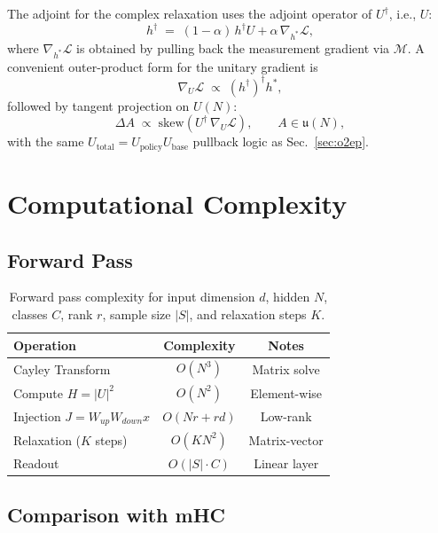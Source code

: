 \documentclass[11pt,a4paper]{article}
\newcommand{\LL}{\mathcal{L}}
\newcommand{\skewop}{\text{skew}}
\begin{document}
The adjoint for the complex relaxation uses the adjoint operator of $U^\dagger$, i.e., $U$:
\begin{equation}
h^\dagger \;=\; (1-\alpha)\,h^\dagger U + \alpha\,\nabla_{h^*}\LL,
\end{equation}
where $\nabla_{h^*}\LL$ is obtained by pulling back the measurement gradient via $\mathcal{M}$. A convenient outer-product form for the unitary gradient is
\begin{equation}
\nabla_U \LL \;\propto\; (h^\dagger)^\dagger h^*,
\end{equation}
followed by tangent projection on $U(N)$:
\begin{equation}
\Delta A \;\propto\; \skewop\!\left(U^\dagger\,\nabla_U\LL\right),\qquad A\in\mathfrak{u}(N),
\end{equation}
with the same $U_{\text{total}}=U_{\text{policy}}U_{\text{base}}$ pullback logic as Sec.~\ref{sec:o2ep}.

\section{Computational Complexity}
\label{sec:complexity}

\subsection{Forward Pass}

\begin{table}[h]
\centering
\begin{tabular}{lcc}
\toprule
\textbf{Operation} & \textbf{Complexity} & \textbf{Notes} \\
\midrule
Cayley Transform & $O(N^3)$ & Matrix solve \\
Compute $H = |U|^2$ & $O(N^2)$ & Element-wise \\
Injection $J = W_{up}W_{down}x$ & $O(Nr + rd)$ & Low-rank \\
Relaxation ($K$ steps) & $O(KN^2)$ & Matrix-vector \\
Readout & $O(|S| \cdot C)$ & Linear layer \\
\bottomrule
\end{tabular}
\caption{Forward pass complexity for input dimension $d$, hidden $N$, classes $C$, rank $r$, sample size $|S|$, and relaxation steps $K$.}
\label{tab:complexity_forward}
\end{table}

\subsection{Comparison with mHC}
\end{document}
